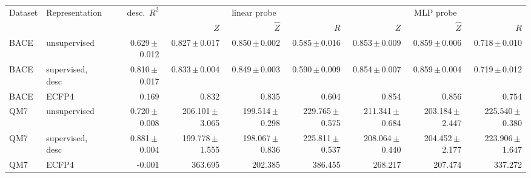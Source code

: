 \begin{tabular}{llrrrrrrr}
\toprule
Dataset & Representation & desc.\ $R^2$ & \multicolumn{3}{c}{linear probe} & \multicolumn{3}{c}{MLP probe} \\
\cmidrule(lr){4-6}\cmidrule(lr){7-9}
 & & & $Z$ & $\hat{Z}$ & $R$ & $Z$ & $\hat{Z}$ & $R$ \\
\midrule
BACE & unsupervised & 0.629\,$\pm$\,0.012 & 0.827\,$\pm$\,0.017 & 0.850\,$\pm$\,0.002 & 0.585\,$\pm$\,0.016 & 0.853\,$\pm$\,0.009 & 0.859\,$\pm$\,0.006 & 0.718\,$\pm$\,0.010 \\
BACE & supervised, desc & 0.810\,$\pm$\,0.017 & 0.833\,$\pm$\,0.004 & 0.849\,$\pm$\,0.003 & 0.590\,$\pm$\,0.009 & 0.854\,$\pm$\,0.007 & 0.859\,$\pm$\,0.004 & 0.719\,$\pm$\,0.012 \\
BACE & ECFP4 & 0.169 & 0.832 & 0.835 & 0.604 & 0.854 & 0.856 & 0.754 \\
QM7 & unsupervised & 0.720\,$\pm$\,0.008 & 206.101\,$\pm$\,3.065 & 199.514\,$\pm$\,0.298 & 229.765\,$\pm$\,0.575 & 211.341\,$\pm$\,0.684 & 203.184\,$\pm$\,2.447 & 225.540\,$\pm$\,0.380 \\
QM7 & supervised, desc & 0.881\,$\pm$\,0.004 & 199.778\,$\pm$\,1.555 & 198.067\,$\pm$\,0.836 & 225.811\,$\pm$\,0.537 & 208.064\,$\pm$\,0.440 & 204.452\,$\pm$\,2.177 & 223.906\,$\pm$\,1.647 \\
QM7 & ECFP4 & -0.001 & 363.695 & 202.385 & 386.455 & 268.217 & 207.474 & 337.272 \\
\bottomrule
\end{tabular}